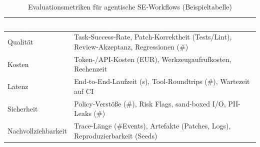 \begin{table}[ht]
\centering
\caption{Evaluationsmetriken für agentische SE-Workflows (Beispieltabelle)}
\label{tab:eval-metrics}
\begin{tabularx}{\textwidth}{lX}
\toprule
\cellcolor{headercolor}\textcolor{white}{\textbf{Kategorie}} & \cellcolor{headercolor}\textcolor{white}{\textbf{Metriken / Beschreibung}} \\
\midrule
Qualität & Task-Success-Rate, Patch-Korrektheit (Tests/Lint), Review-Akzeptanz, Regressionen (\#) \\
\rowcolor{rowcolorgray}
Kosten & Token-/API-Kosten (EUR), Werkzeugaufrufkosten, Rechenzeit \\
Latenz & End-to-End-Laufzeit (s), Tool-Roundtrips (\#), Wartezeit auf CI \\
\rowcolor{rowcolorgray}
Sicherheit & Policy-Verstöße (\#), Risk Flags, sand-boxed I/O, PII-Leaks (\#) \\
Nachvollziehbarkeit & Trace-Länge (\#Events), Artefakte (Patches, Logs), Reproduzierbarkeit (Seeds) \\
\bottomrule
\end{tabularx}
\end{table}
